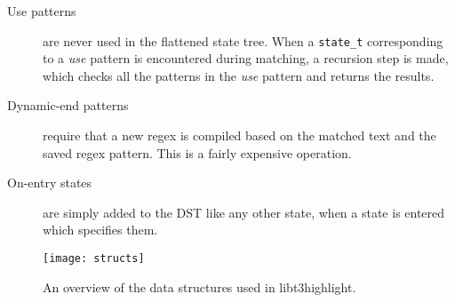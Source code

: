 \documentclass[a4paper]{article}
\begin{document}
\begin{multicols}{2}
\begin{description}
\item[Use patterns] are never used in the flattened state tree. When a
{\tt state_t} corresponding to a {\it use} pattern is encountered during matching, a
recursion step is made, which checks all the patterns in the {\it use} pattern
and returns the results.
\item[Dynamic-end patterns] require that a new regex is compiled based on the
matched text and the saved regex pattern. This is a fairly expensive operation.
\item[On-entry states] are simply added to the DST like any other state, when
a state is entered which specifies them.
\end{description}
\end{multicols}

\begin{figure}
\centering
\texttt{[image: structs]}
\caption{An overview of the data structures used in libt3highlight.}
\end{figure}
\end{document}
